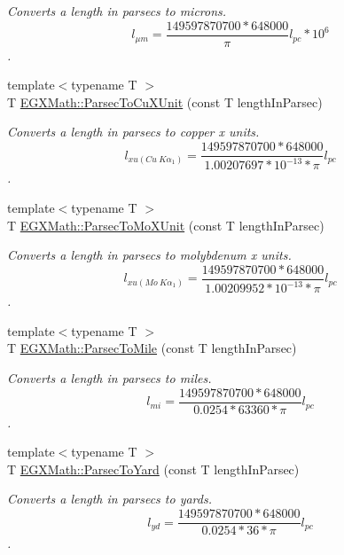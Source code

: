 \begin{DoxyCompactItemize}
\begin{DoxyCompactList}\small\item\em Converts a length in parsecs to microns. \[ l_{\mu m}=\frac{149597870700 * 648000}{\pi}l_{pc} * 10^{6} \]. \end{DoxyCompactList}\item 
{\footnotesize template$<$typename T $>$ }\\T \mbox{\hyperlink{group___e_g_x_math-_conversions-_length_conversions-_astronomical-_parsec-_non-_s_i_gad21a910de08e37197d58edf64c377222}{E\+G\+X\+Math\+::\+Parsec\+To\+Cu\+X\+Unit}} (const T length\+In\+Parsec)
\begin{DoxyCompactList}\small\item\em Converts a length in parsecs to copper x units. \[ l_{xu(Cu\ K\alpha_1)}= \frac{149597870700 * 648000}{1.00207697*10^{-13} * \pi} l_{pc}\]. \end{DoxyCompactList}\item 
{\footnotesize template$<$typename T $>$ }\\T \mbox{\hyperlink{group___e_g_x_math-_conversions-_length_conversions-_astronomical-_parsec-_non-_s_i_gaf076c4eb125bbc9fbabc040300961b6d}{E\+G\+X\+Math\+::\+Parsec\+To\+Mo\+X\+Unit}} (const T length\+In\+Parsec)
\begin{DoxyCompactList}\small\item\em Converts a length in parsecs to molybdenum x units. \[ l_{xu(Mo\ K\alpha_1)}=\frac{149597870700 * 648000}{1.00209952*10^{-13}* \pi} l_{pc}\]. \end{DoxyCompactList}\item 
{\footnotesize template$<$typename T $>$ }\\T \mbox{\hyperlink{group___e_g_x_math-_conversions-_length_conversions-_astronomical-_parsec-_imperial_gaff2c298a0830dd20dc3acce2d9d789f8}{E\+G\+X\+Math\+::\+Parsec\+To\+Mile}} (const T length\+In\+Parsec)
\begin{DoxyCompactList}\small\item\em Converts a length in parsecs to miles. \[ l_{mi}=\frac{149597870700 * 648000}{ 0.0254 * 63360 * \pi} l_{pc} \]. \end{DoxyCompactList}\item 
{\footnotesize template$<$typename T $>$ }\\T \mbox{\hyperlink{group___e_g_x_math-_conversions-_length_conversions-_astronomical-_parsec-_imperial_gae9ae73b70979fb012736516147854cf4}{E\+G\+X\+Math\+::\+Parsec\+To\+Yard}} (const T length\+In\+Parsec)
\begin{DoxyCompactList}\small\item\em Converts a length in parsecs to yards. \[ l_{yd}= \frac{149597870700 * 648000}{0.0254 * 36 * \pi} l_{pc} \]. \end{DoxyCompactList}\item 

\end{DoxyCompactItemize}
